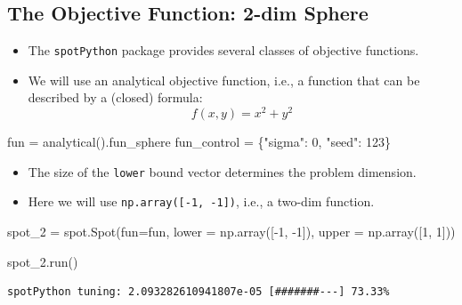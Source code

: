 \documentclass[
  letterpaper,
  DIV=11,
  numbers=noendperiod]{scrreprt}
\newenvironment{Shaded}{\begin{snugshade}}{\end{snugshade}}
\newcommand{\DecValTok}[1]{\textcolor[rgb]{0.68,0.00,0.00}{#1}}
\newcommand{\NormalTok}[1]{\textcolor[rgb]{0.00,0.23,0.31}{#1}}
\newcommand{\OperatorTok}[1]{\textcolor[rgb]{0.37,0.37,0.37}{#1}}
\newcommand{\StringTok}[1]{\textcolor[rgb]{0.13,0.47,0.30}{#1}}
\providecommand{\tightlist}{%
  \setlength{\itemsep}{0pt}\setlength{\parskip}{0pt}}\usepackage{longtable,booktabs,array}
\begin{document}
\hypertarget{the-objective-function-2-dim-sphere}{%
\subsection{The Objective Function: 2-dim
Sphere}\label{the-objective-function-2-dim-sphere}}

\begin{itemize}
\tightlist
\item
  The \texttt{spotPython} package provides several classes of objective
  functions.
\item
  We will use an analytical objective function, i.e., a function that
  can be described by a (closed) formula: \[f(x, y) = x^2 + y^2\]
\end{itemize}

\begin{Shaded}
\begin{Highlighting}[]
\NormalTok{fun }\OperatorTok{=}\NormalTok{ analytical().fun\_sphere}
\NormalTok{fun\_control }\OperatorTok{=}\NormalTok{ \{}\StringTok{"sigma"}\NormalTok{: }\DecValTok{0}\NormalTok{,}
               \StringTok{"seed"}\NormalTok{: }\DecValTok{123}\NormalTok{\}}
\end{Highlighting}
\end{Shaded}

\begin{itemize}
\tightlist
\item
  The size of the \texttt{lower} bound vector determines the problem
  dimension.
\item
  Here we will use \texttt{np.array({[}-1,\ -1{]})}, i.e., a two-dim
  function.
\end{itemize}

\begin{Shaded}
\begin{Highlighting}[]
\NormalTok{spot\_2 }\OperatorTok{=}\NormalTok{ spot.Spot(fun}\OperatorTok{=}\NormalTok{fun,}
\NormalTok{                   lower }\OperatorTok{=}\NormalTok{ np.array([}\OperatorTok{{-}}\DecValTok{1}\NormalTok{, }\OperatorTok{{-}}\DecValTok{1}\NormalTok{]),}
\NormalTok{                   upper }\OperatorTok{=}\NormalTok{ np.array([}\DecValTok{1}\NormalTok{, }\DecValTok{1}\NormalTok{]))}

\NormalTok{spot\_2.run()}
\end{Highlighting}
\end{Shaded}

\begin{verbatim}
spotPython tuning: 2.093282610941807e-05 [#######---] 73.33% 
\end{verbatim}
\end{document}
